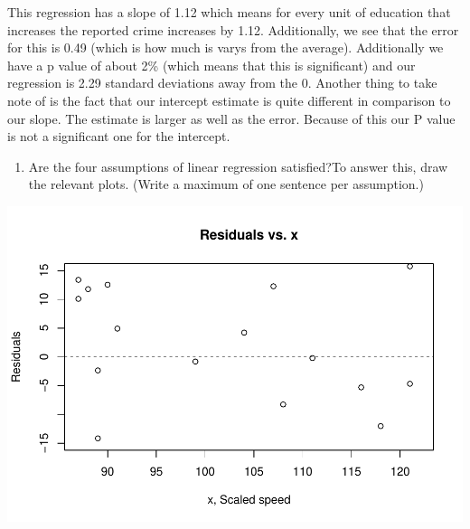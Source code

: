 \documentclass[
]{article}
\newenvironment{Shaded}{\begin{snugshade}}{\end{snugshade}}
\newcommand{\AttributeTok}[1]{\textcolor[rgb]{0.77,0.63,0.00}{#1}}
\newcommand{\DecValTok}[1]{\textcolor[rgb]{0.00,0.00,0.81}{#1}}
\newcommand{\FunctionTok}[1]{\textcolor[rgb]{0.00,0.00,0.00}{#1}}
\newcommand{\NormalTok}[1]{#1}
\newcommand{\SpecialCharTok}[1]{\textcolor[rgb]{0.00,0.00,0.00}{#1}}
\newcommand{\StringTok}[1]{\textcolor[rgb]{0.31,0.60,0.02}{#1}}
\providecommand{\tightlist}{%
  \setlength{\itemsep}{0pt}\setlength{\parskip}{0pt}}
\begin{document}
This regression has a slope of 1.12 which means for every unit of
education that increases the reported crime increases by 1.12.
Additionally, we see that the error for this is 0.49 (which is how much
is varys from the average). Additionally we have a p value of about 2\%
(which means that this is significant) and our regression is 2.29
standard deviations away from the 0. Another thing to take note of is
the fact that our intercept estimate is quite different in comparison to
our slope. The estimate is larger as well as the error. Because of this
our P value is not a significant one for the intercept.

\begin{enumerate}
\def\labelenumi{\arabic{enumi}.}
\setcounter{enumi}{3}
\tightlist
\item
  Are the four assumptions of linear regression satisfied?To answer
  this, draw the relevant plots. (Write a maximum of one sentence per
  assumption.)
\end{enumerate}

\begin{Shaded}
\end{Shaded}

\includegraphics{Journal_files/figure-latex/unnamed-chunk-39-1.pdf}
\end{document}
